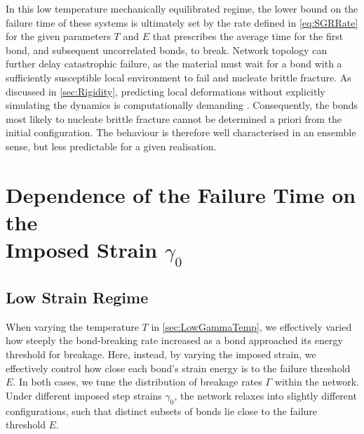 In this low temperature mechanically equilibrated regime, the lower bound on the failure time of these systems is ultimately set by the rate defined in \cref{eq:SGRRate} for the given parameters $T$ and $E$ that prescribes the average time for the first bond, and subsequent uncorrelated bonds, to break. Network topology can further delay catastrophic failure, as the material must wait for a bond with a sufficiently susceptible local environment to fail and nucleate brittle fracture. As discussed in \cref{sec:Rigidity}, predicting local deformations without explicitly simulating the dynamics is computationally demanding \cite{damavandi_energetic_2022,damavandi_energetic_2022-1}. Consequently, the bonds most likely to nucleate brittle fracture cannot be determined a priori from the initial configuration. The behaviour is therefore well characterised in an ensemble sense, but less predictable for a given realisation.

\section[Dependence of the Failure Time on the Imposed Strain \texorpdfstring{$\gamma_0$}{gamma 0}]{Dependence of the Failure Time on the \\ Imposed Strain \texorpdfstring{$\gamma_0$}{gamma 0}} \label{sec:DelayedGamma}
\subsection{Low Strain Regime}

When varying the temperature $T$ in \cref{sec:LowGammaTemp}, we effectively varied how steeply the bond-breaking rate increased as a bond approached its energy threshold for breakage. Here, instead, by varying the imposed strain, we effectively control how close each bond’s strain energy is to the failure threshold $E$. In both cases, we tune the distribution of breakage rates $\Gamma$ within the network. Under different imposed step strains $\gamma_0$, the network relaxes into slightly different configurations, such that distinct subsets of bonds lie close to the failure threshold $E$.

